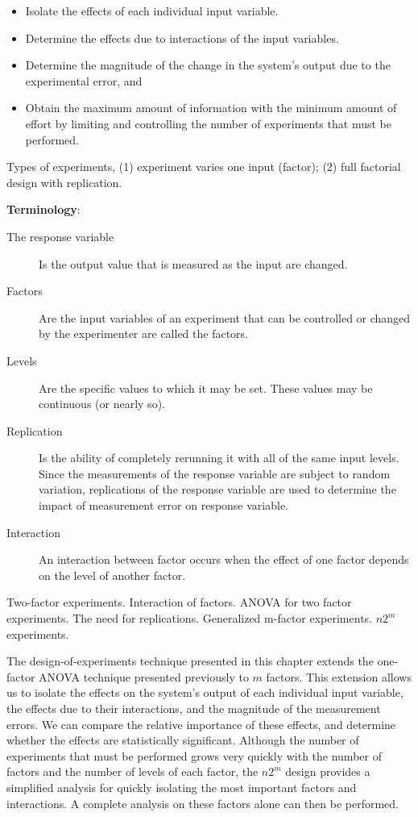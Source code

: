\documentclass[openany, a4paper]{book}
\theoremstyle{plain}
\theoremstyle{definition}
\theoremstyle{remark}
\begin{document}
\begin{itemize}
\item Isolate the effects of each individual input variable.
\item Determine the effects due to interactions of the input variables.
\item Determine the magnitude of the change in the system's output due to the
experimental error, and
\item Obtain the maximum amount of information with the minimum amount of effort
by limiting and controlling the number of experiments that must be
performed.
\end{itemize}

Types of experiments, (1) experiment varies one input (factor); (2) full
factorial design with replication.

\textbf{Terminology}:

\begin{description}
\item[{The response variable}] Is the output value that is measured as the input
are changed.
\item[{Factors}] Are the input variables of an experiment that can be controlled
or changed by the experimenter are called the factors.
\item[{Levels}] Are the specific values to which it may be set. These values may
be continuous (or nearly so).
\item[{Replication}] Is the ability of completely rerunning it with all of the
same input levels. Since the measurements of the response variable are
subject to random variation, replications of the response variable are
used to determine the impact of measurement error on response variable.
\item[{Interaction}] An interaction between factor occurs when the effect of one
factor depends on the level of another factor.
\end{description}


Two-factor experiments. Interaction of factors. ANOVA for two factor
experiments. The need for replications. Generalized m-factor
experiments. \(n2^m\) experiments.

The design-of-experiments technique presented in this chapter extends the
one-factor ANOVA technique presented previously to \(m\) factors. This
extension allows us to isolate the effects on the system's output of each
individual input variable, the effects due to their interactions, and the
magnitude of the measurement errors. We can compare the relative importance
of these effects, and determine whether the effects are statistically
significant. Although the number of experiments that must be performed grows
very quickly with the number of factors and the number of levels of each
factor, the \(n2^m\) design provides a simplified analysis for quickly
isolating the most important factors and interactions. A complete analysis
on these factors alone can then be performed.
\end{document}
